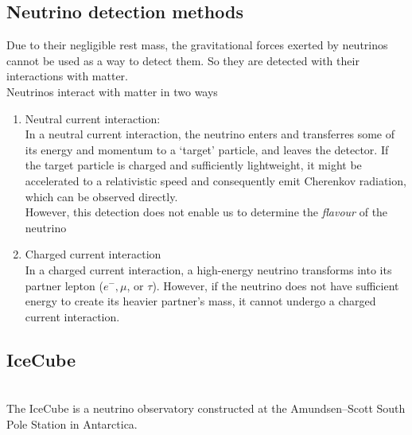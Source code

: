 \documentclass{article}
\begin{document}
\subsection{\large Neutrino detection methods}
Due to their negligible rest mass, the gravitational forces exerted by neutrinos cannot be used as a way to detect them. So they are detected with their interactions with matter.\\
Neutrinos interact with matter in two ways
\begin{enumerate}
    \item Neutral current interaction:\\
    \quad In a neutral current interaction, the neutrino enters and transferres some of its energy and momentum to a ‘target’ particle, and leaves the detector. If the target particle is charged and sufficiently lightweight, it might be accelerated to a relativistic speed and consequently emit Cherenkov radiation, which can be observed directly.\\
    However, this detection does not enable us to determine the \emph{flavour} of the neutrino
    \item Charged current interaction\\
    \quad In a charged current interaction, a high-energy neutrino transforms into its partner lepton ($e^-, \mu$, or $\tau$). However, if the neutrino does not have sufficient energy to create its heavier partner's mass, it cannot undergo a charged current interaction.
\end{enumerate}
\subsection{\large IceCube}
\\
The IceCube is a neutrino observatory constructed at the Amundsen–Scott South Pole Station in Antarctica.
\end{document}
